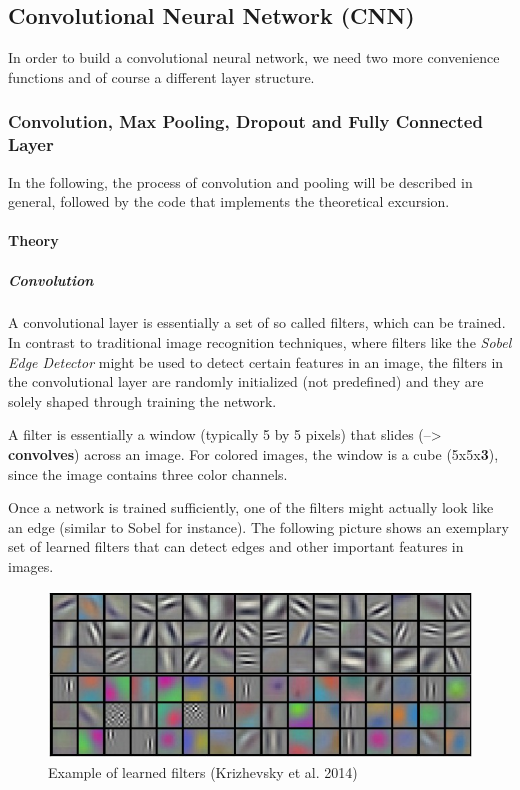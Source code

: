 \documentclass[]{article}
\let\oldparagraph\paragraph
\renewcommand{\paragraph}[1]{\oldparagraph{#1}\mbox{}}
\let\oldsubparagraph\subparagraph
\renewcommand{\subparagraph}[1]{\oldsubparagraph{#1}\mbox{}}
\begin{document}
\subsection{Convolutional Neural Network
(CNN)}\label{convolutional-neural-network-cnn}

In order to build a convolutional neural network, we need two more
convenience functions and of course a different layer structure.

\subsubsection{Convolution, Max Pooling, Dropout and Fully Connected
Layer}\label{convolution-max-pooling-dropout-and-fully-connected-layer}

In the following, the process of convolution and pooling will be
described in general, followed by the code that implements the
theoretical excursion.

\paragraph{Theory}\label{theory}

\subparagraph{Convolution}\label{convolution}

A convolutional layer is essentially a set of so called filters, which
can be trained. In contrast to traditional image recognition techniques,
where filters like the \emph{Sobel Edge Detector} might be used to
detect certain features in an image, the filters in the convolutional
layer are randomly initialized (not predefined) and they are solely
shaped through training the network.

A filter is essentially a window (typically 5 by 5 pixels) that slides
(--\textgreater{} \textbf{convolves}) across an image. For colored
images, the window is a cube (5x5x\textbf{3}), since the image contains
three color channels.

Once a network is trained sufficiently, one of the filters might
actually look like an edge (similar to Sobel for instance). The
following picture shows an exemplary set of learned filters that can
detect edges and other important features in images.

\begin{figure}
\centering
\includegraphics{figures/learned_filters_example.jpeg}
\caption{Example of learned filters (Krizhevsky et al. 2014)}
\end{figure}
\end{document}
